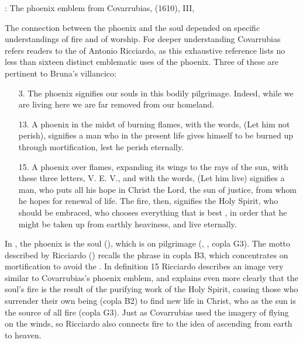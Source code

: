{: The phoenix emblem from Covarrubias,
 (1610),  III, }

The connection between the phoenix and the soul depended on specific
understandings of fire and of worship.
For deeper understanding Covarrubias refers readers to the  of Antonio Ricciardo, as this exhaustive reference lists no less
than sixteen distinct emblematic uses of the phoenix.
Three of these are pertinent to Bruna's villancico:
\begin{quoting}
    \begin{enumerate}
        \item[3.] The phoenix signifies our souls in this bodily pilgrimage.  
            Indeed, while we are living here we are far removed from our
            homeland.
        \item[13.] A phoenix in the midst of burning flames, with the words,
             (Let him not perish), signifies a man who in
            the present life gives himself to be burned up through 
            mortification, lest he perish eternally.
        \item[15.] A phoenix over flames, expanding its wings to the rays of
            the sun, with these three letters, V. E. V., and with the words,
             (Let him live) \Dots{} signifies a man, who puts
            all his hope in Christ the Lord, the sun of justice, from whom he
            hopes for renewal of life.  
            The fire, then, signifies the Holy Spirit, who should be embraced,
            who chooses everything that is best , in order
            that he might be taken up from earthly heaviness, and live
            eternally.%
                \Autocite[, 132--133]
                {Ricciardo:CommentariaSymbolica}
    \end{enumerate}
\end{quoting}
In , the phoenix is the soul (), which is
on pilgrimage (, , copla G3).
The motto  described by Ricciardo () recalls
the phrase  in copla B3, which concentrates on
mortification to avoid the .
In definition 15 Ricciardo describes an image very similar to Covarrubias's
phoenix emblem, and explains even more clearly that the soul's fire is the
result of the purifying work of the Holy Spirit, causing those who surrender
their own being (copla B2) to find new life in Christ, who as the sun is the
source of all fire (copla G3).
Just as Covarrubias used the imagery of flying on the winds, so Ricciardo also
connects fire to the idea of ascending from earth to heaven.

